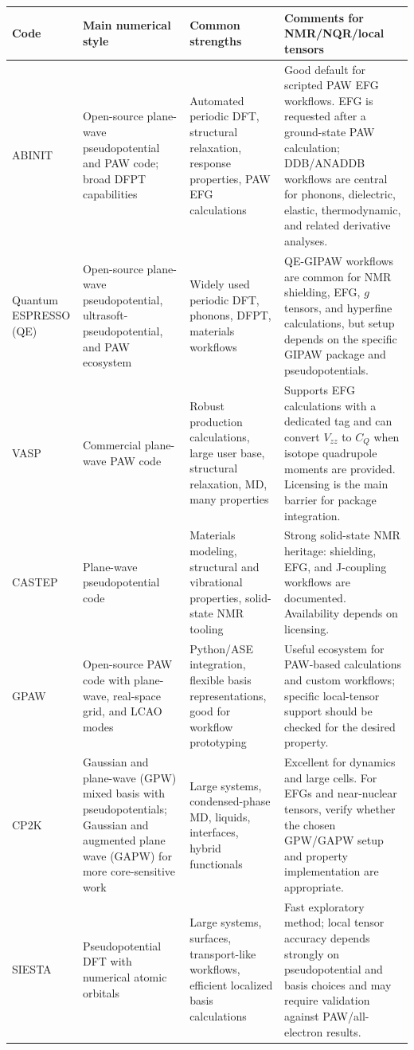 \documentclass[11pt]{article}
\newcommand{\CQ}{C_Q}
\begin{document}
\begin{longtable}{@{}L{0.14\textwidth}L{0.22\textwidth}L{0.25\textwidth}L{0.29\textwidth}@{}}
\toprule
\textbf{Code} & \textbf{Main numerical style} & \textbf{Common strengths} & \textbf{Comments for NMR/NQR/local tensors} \\
\midrule
\endhead
ABINIT & Open-source plane-wave pseudopotential and PAW code; broad DFPT capabilities & Automated periodic DFT, structural relaxation, response properties, PAW EFG calculations & Good default for scripted PAW EFG workflows.  EFG is requested after a ground-state PAW calculation; DDB/ANADDB workflows are central for phonons, dielectric, elastic, thermodynamic, and related derivative analyses. \\
Quantum ESPRESSO (QE) & Open-source plane-wave pseudopotential, ultrasoft-pseudopotential, and PAW ecosystem & Widely used periodic DFT, phonons, DFPT, materials workflows & QE-GIPAW workflows are common for NMR shielding, EFG, $g$ tensors, and hyperfine calculations, but setup depends on the specific GIPAW package and pseudopotentials. \\
VASP & Commercial plane-wave PAW code & Robust production calculations, large user base, structural relaxation, MD, many properties & Supports EFG calculations with a dedicated tag and can convert $V_{zz}$ to $\CQ$ when isotope quadrupole moments are provided.  Licensing is the main barrier for package integration. \\
CASTEP & Plane-wave pseudopotential code & Materials modeling, structural and vibrational properties, solid-state NMR tooling & Strong solid-state NMR heritage: shielding, EFG, and J-coupling workflows are documented.  Availability depends on licensing. \\
GPAW & Open-source PAW code with plane-wave, real-space grid, and LCAO modes & Python/ASE integration, flexible basis representations, good for workflow prototyping & Useful ecosystem for PAW-based calculations and custom workflows; specific local-tensor support should be checked for the desired property. \\
CP2K & Gaussian and plane-wave (GPW) mixed basis with pseudopotentials; Gaussian and augmented plane wave (GAPW) for more core-sensitive work & Large systems, condensed-phase MD, liquids, interfaces, hybrid functionals & Excellent for dynamics and large cells.  For EFGs and near-nuclear tensors, verify whether the chosen GPW/GAPW setup and property implementation are appropriate. \\
SIESTA & Pseudopotential DFT with numerical atomic orbitals & Large systems, surfaces, transport-like workflows, efficient localized basis calculations & Fast exploratory method; local tensor accuracy depends strongly on pseudopotential and basis choices and may require validation against PAW/all-electron results. \\

\end{longtable}
\end{document}
